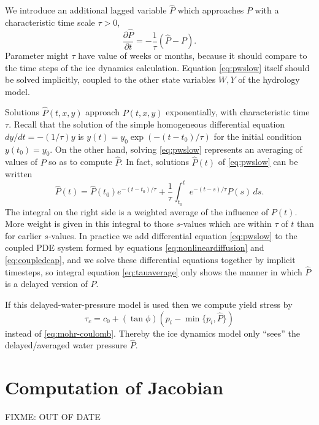 \documentclass[11pt]{amsart}
\newcommand{\hpw}{\hat P}
\begin{document}
We introduce an additional lagged variable $\hpw$ which approaches $P$ with a characteristic time scale $\tau>0$,
\begin{equation}
\label{eq:pwslow}
  \frac{\partial \hpw}{\partial t} = -\frac{1}{\tau} (\hpw - P).
\end{equation}
Parameter might $\tau$ have value of weeks or months, because it should compare to the time steps of the ice dynamics calculation.  Equation \eqref{eq:pwslow} itself should be solved implicitly, coupled to the other state variables $W,Y$ of the hydrology model.

Solutions $\hpw(t,x,y)$ approach $P(t,x,y)$ exponentially, with characteristic time $\tau$. Recall that the solution of the simple homogeneous differential equation $dy/dt = - (1/\tau) y$ is $y(t) = y_0 \exp\left(-(t-t_0)/\tau\right)$ for the initial condition $y(t_0)=y_0$.  On the other hand, solving \eqref{eq:pwslow} represents an averaging of values of $P$ so as to compute $\hpw$.  In fact, solutions $\hpw(t)$ of \eqref{eq:pwslow} can be written
\begin{equation}\label{eq:tauaverage}
\hpw(t) = \hpw(t_0) e^{-(t-t_0)/\tau} + \frac{1}{\tau} \int_{t_0}^t e^{-(t-s)/\tau} P(s)\,ds.
\end{equation}
The integral on the right side is a weighted average of the influence of $P(t)$.  More weight is given in this integral to those $s$-values which are within $\tau$ of $t$ than for earlier $s$-values.  In practice we add differential equation \eqref{eq:pwslow} to the coupled PDE system formed by equations \eqref{eq:nonlineardiffusion} and \eqref{eq:coupledcap}, and we solve these differential equations together by implicit timesteps, so integral equation \eqref{eq:tauaverage} only shows the manner in which $\hpw$ is a delayed version of $P$.

If this delayed-water-pressure model is used then we compute yield stress by
\begin{equation} \label{eq:mohr-coulomb-delayed}
  \tau_c = c_0 + (\tan{\phi}) (p_i - \min\{p_i,\hpw\})
\end{equation}
instead of \eqref{eq:mohr-coulomb}.  Thereby the ice dynamics model only ``sees'' the delayed/averaged water pressure $\hpw$.


\section{Computation of Jacobian} \label{app:jacobian}  FIXME: OUT OF DATE
\end{document}
